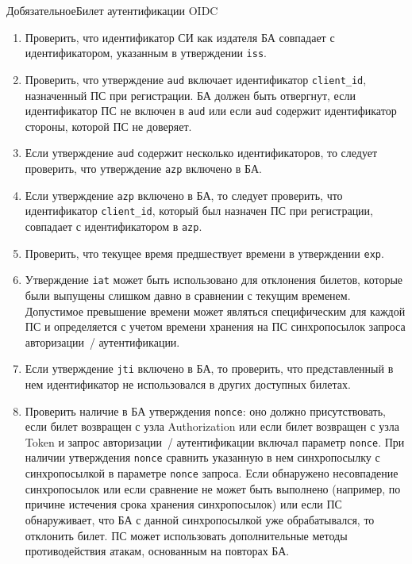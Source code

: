 \begin{appendix}{Д}{обязательное}{Билет аутентификации OIDC}
\begin{enumerate}
\item  
Проверить, что идентификатор СИ как издателя БА совпадает с идентификатором, 
указанным в утверждении \lstinline{iss}.

\item 
Проверить, что утверждение \lstinline{aud} включает идентификатор 
\lstinline{client_id}, назначенный ПС при регистрации.
%
БА должен быть отвергнут, если идентификатор ПС не включен в \lstinline{aud}
или если \lstinline{aud} содержит идентификатор стороны, которой ПС не 
доверяет. 

\item 
Если утверждение \lstinline{aud} содержит несколько идентификаторов, 
то следует проверить, что утверждение \lstinline{azp} включено в БА. 

\item  
Если утверждение \lstinline{azp} включено в БА, то следует проверить, 
что идентификатор \lstinline{client_id}, который был назначен ПС при 
регистрации, совпадает с идентификатором в \lstinline{azp}.

\item 
Проверить, что текущее время предшествует времени в утверждении 
\lstinline{exp}. 

\item 
Утверждение \lstinline{iat} может быть использовано для отклонения
билетов, которые были выпущены слишком давно в сравнении с текущим временем.
Допустимое превышение времени может являться специфическим 
для каждой ПС и определяется с учетом времени хранения на ПС синхропосылок 
запроса авторизации~/ аутентификации.

\item
Если утверждение \lstinline{jti} включено в БА, то проверить, что 
представленный в нем идентификатор не использовался в других доступных
билетах.

\item 
Проверить наличие в БА утверждения \lstinline{nonce}: оно должно 
присутствовать, если билет возвращен с узла Authorization или если билет 
возвращен с узла Token и запрос авторизации~/ аутентификации включал параметр 
\lstinline{nonce}.
%
При наличии утверждения \lstinline{nonce} сравнить указанную в нем 
синхропосылку с синхропосылкой в параметре \lstinline{nonce} запроса.
%
Если обнаружено несовпадение синхропосылок или если сравнение не может быть 
выполнено (например, по причине истечения срока хранения синхропосылок) или если
ПС обнаруживает, что БА с данной синхропосылкой уже обрабатывался, 
то отклонить билет.
%
ПС может использовать дополнительные методы противодействия атакам, основанным 
на повторах БА. 


\end{enumerate}
\end{appendix}
